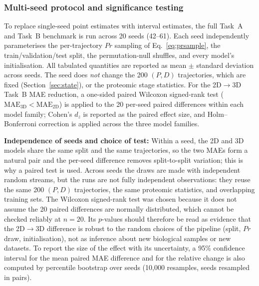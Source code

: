 \documentclass[5p,times,twocolumn]{elsarticle}
\newcommand{\rtag}[1]{}
\newcommand{\rev}[2]{\rtag{#1}#2}
\newenvironment{revblock}[1]{\par\rtag{#1}\ignorespaces}{\par}
\newcommand{\lang}[1]{#1}
\begin{document}
\subsubsection{Multi-seed protocol and significance testing}
\label{sec:multiseed}

To replace single-seed point estimates with interval
estimates, the full Task~A and Task~B benchmark is run across
20 seeds \rev{R1.4,R2.9}{(42--61)}. Each seed independently parameterises the
per-trajectory $Pr$ sampling of \rev{AC}{Eq.~\eqref{eq:prsample}}, the
train/validation/test split, the permutation-null shuffles,
and every model's initialisation. All tabulated quantities
are reported as mean $\pm$ standard deviation across seeds.
\rev{R1.4,R2.9}{The seed does \textit{not} change the 200
  $(P, D)$ trajectories, which are fixed (Section~\ref{sec:state}),
  or the proteomic stage statistics.}
For the 2D$\to$3D Task~B MAE reduction, a one-sided paired
Wilcoxon signed-rank test (\rev{AC}{$\text{MAE}_{3\text{D}} <
\text{MAE}_{2\text{D}}$}) is applied to the 20 per-seed paired
differences within each model family\lang{;} Cohen's $d_{z}$ is
reported as the paired effect size, and Holm--Bonferroni
correction is applied across the three model families.

\begin{revblock}{R2.9,R1.4}
  \textbf{Independence of seeds and choice of test:}
  Within a seed, the 2D and 3D models share the same split and
  the same trajectories, so the two MAEs form a natural pair and
  the per-seed difference removes split-to-split variation; this
  is why a paired test is used. Across seeds the draws are made
  with independent random streams, but the runs are not fully
  independent observations: they reuse the same 200 $(P, D)$
  trajectories, the same proteomic statistics, and overlapping
  training sets. The Wilcoxon signed-rank test was chosen
  because it does not assume the 20 paired differences are
  normally distributed, which cannot be checked reliably at
  $n = 20$. Its $p$-values should therefore be read as evidence
  that the 2D$\to$3D difference is robust to the random choices
  of the pipeline (split, $Pr$ draw, initialisation), not as
  inference about new biological samples or new datasets.
  To report the size of the effect with its uncertainty, a 95\%
  confidence interval for the mean paired MAE difference and for
  the relative change is also computed by percentile bootstrap
  over seeds (10,000 resamples, seeds resampled in pairs).
\end{revblock}
\end{document}
